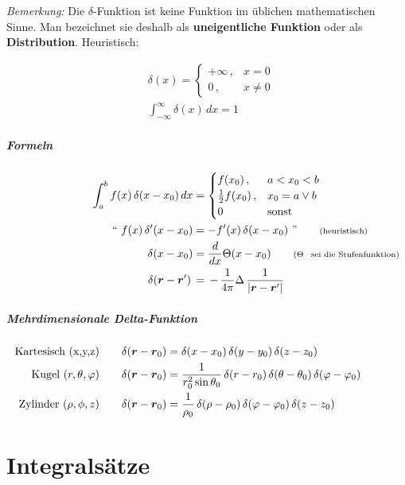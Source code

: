 \documentclass[titlepage,11pt,a4paper,ngerman]{report}
\renewcommand{\vec}[1]{\boldsymbol{#1}}
\begin{document}
\emph{Bemerkung:} Die $\delta$-Funktion ist keine Funktion im üblichen mathematischen Sinne. Man bezeichnet sie deshalb als \textbf{uneigentliche Funktion} oder als \textbf{Distribution}. Heuristisch:

\begin{align*}
&\delta(x) = 
	\begin{cases}
		+ \infty \, , & x = 0 \\
		0 \, , & x \neq 0
	\end{cases} \\
&\int_{-\infty}^{\infty} \delta (x) \, dx = 1
\end{align*}

\subparagraph{Formeln}
\begin{align*}
\int_{a}^{b} f(x) \, \delta (x-x_0) \, dx &= 
	\begin{cases}
		f(x_0) \, , & a < x_0 < b \\
		\frac{1}{2} f(x_0) \, , & x_0 = a \lor b \\
		0 \, & \text{sonst}
	\end{cases} \\
`` \ f(x) \, \delta '(x-x_0) &= -f'(x) \, \delta (x-x_0) \ " \qquad \rlap{\text{\scriptsize{(heuristisch)}}} \\
\delta (x - x_0) &= \frac{d}{dx} \Theta (x - x_0) \qquad \rlap{\scriptsize{($ \Theta $ \, \text{sei die Stufenfunktion)}}}\\
\delta(\vec{r}-\vec{r}')\,&=\,-\,\frac{1}{4\pi}\Delta\,\frac{1}{|\vec{r}-\vec{r}'|}
\end{align*} 

\subparagraph{Mehrdimensionale Delta-Funktion}
\begin{align*}\hspace{1.5cm}
\llap{\text{Kartesisch (x,y,z)}} \qquad \delta(\vec{r} - \vec{r}_0) &= \delta(x - x_0) \, \delta(y - y_0) \, \delta(z - z_0) \\
\llap{\text{Kugel $ (r, \theta, \varphi) $}} \qquad \delta(\vec{r} - \vec{r}_0) &= \frac{1}{r^2_0 \sin\theta_0} \, \delta(r - r_0) \, \delta(\theta - \theta _0) \, \delta(\varphi - \varphi _0) \\
\llap{\text{Zylinder $ (\rho , \phi , z) $}} \qquad \delta(\vec{r} - \vec{r}_0) &= \frac{1}{\rho _0} \, \delta(\rho - \rho _0) \, \delta(\varphi - \varphi _0) \, \delta(z - z _0)
\end{align*}

\section{Integralsätze}
\end{document}
